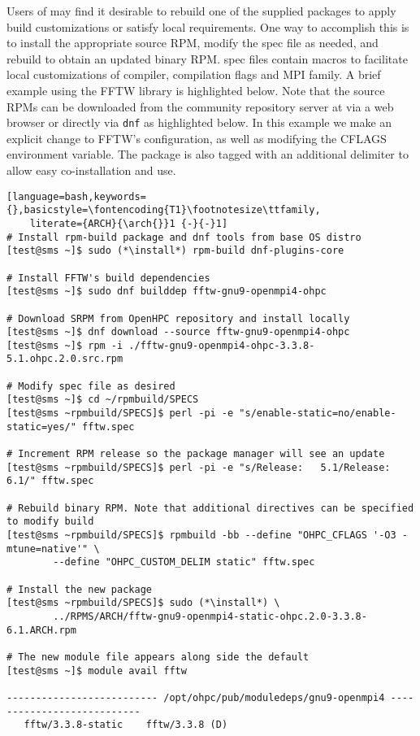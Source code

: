 Users of \OHPC{} may find it desirable to rebuild one of the supplied packages
to apply build customizations or satisfy local requirements. One way to
accomplish this is to install the appropriate source RPM, modify the spec file
as needed, and rebuild to obtain an updated binary RPM. \OHPC{} spec files
contain macros to facilitate local customizations of compiler, compilation
flags and MPI family. A brief example using
the FFTW library is highlighted below.  Note that the source RPMs can be downloaded from the
community repository server at \href{http://repos.openhpc.community}
{\color{blue}{http://repos.openhpc.community}} via a web browser or directly
via \texttt{dnf} as highlighted below. In this example we make an explicit
change to FFTW's configuration, as well as modifying the CFLAGS environment
variable. The package is also tagged with an additional delimiter to allow easy
co-installation and use.

\begin{lstlisting}[language=bash,keywords={},basicstyle=\fontencoding{T1}\footnotesize\ttfamily,
    literate={ARCH}{\arch{}}1 {-}{-}1]
# Install rpm-build package and dnf tools from base OS distro
[test@sms ~]$ sudo (*\install*) rpm-build dnf-plugins-core

# Install FFTW's build dependencies
[test@sms ~]$ sudo dnf builddep fftw-gnu9-openmpi4-ohpc

# Download SRPM from OpenHPC repository and install locally
[test@sms ~]$ dnf download --source fftw-gnu9-openmpi4-ohpc
[test@sms ~]$ rpm -i ./fftw-gnu9-openmpi4-ohpc-3.3.8-5.1.ohpc.2.0.src.rpm

# Modify spec file as desired
[test@sms ~]$ cd ~/rpmbuild/SPECS
[test@sms ~rpmbuild/SPECS]$ perl -pi -e "s/enable-static=no/enable-static=yes/" fftw.spec

# Increment RPM release so the package manager will see an update
[test@sms ~rpmbuild/SPECS]$ perl -pi -e "s/Release:   5.1/Release:   6.1/" fftw.spec

# Rebuild binary RPM. Note that additional directives can be specified to modify build
[test@sms ~rpmbuild/SPECS]$ rpmbuild -bb --define "OHPC_CFLAGS '-O3 -mtune=native'" \
        --define "OHPC_CUSTOM_DELIM static" fftw.spec

# Install the new package
[test@sms ~rpmbuild/SPECS]$ sudo (*\install*) \
        ../RPMS/ARCH/fftw-gnu9-openmpi4-static-ohpc.2.0-3.3.8-6.1.ARCH.rpm

# The new module file appears along side the default
[test@sms ~]$ module avail fftw

-------------------------- /opt/ohpc/pub/moduledeps/gnu9-openmpi4 ---------------------------
   fftw/3.3.8-static    fftw/3.3.8 (D)
\end{lstlisting}
